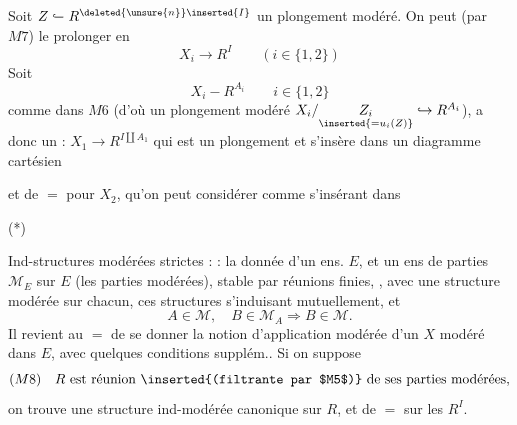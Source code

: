 Soit $Z\mathrel{\lhook\joinrel\relbar}R^{\deleted{\unsure{n}}\inserted{I}}$ un plongement modéré. On peut (par $M7$) le prolonger en
\[
 X_i\longrightarrow R^I\qquad(i\in\{1,2\})
\]
Soit \unsure{(}
\[
 X_i\mathbin{-}R^{A_i}\qquad i\in\{1,2\}
\]
comme dans $M6$ (d'où un  plongement modéré $X_i/\underset{\inserted{=u_i(Z)}}{Z_i}\hookrightarrow R^{A_i}$),  a donc un : $X_1\longrightarrow R^{I\amalg A_1}$ qui est un plongement et s'insère dans un diagramme cartésien
\par\noindent{}\par
et de $=$ pour $X_2$,  qu'on peut considérer comme  s'insérant dans
\par\noindent(*)\quad{}\par
{}

Ind-structures modérées strictes   :  : la donnée d'un ens. $E$, et un ens de parties $\mathcal M_E$ sur $E$ (les parties modérées), stable par réunions finies, , avec une structure modérée sur chacun, ces structures s'induisant mutuellement, et
\[
 A\in\mathcal M,\quad B\in\mathcal M_A\Longrightarrow B\in\mathcal M.
\]
Il revient au $=$ de se donner la notion d'application modérée d'un $X$ modéré dans $E$, avec  quelques conditions supplém.. Si on suppose
\[
 (M8)\quad R\text{ est réunion \inserted{(filtrante par $M5$)} de ses parties modérées},
\]
on trouve une structure ind-modérée canonique sur $R$, et de $=$ sur les $R^I$.

